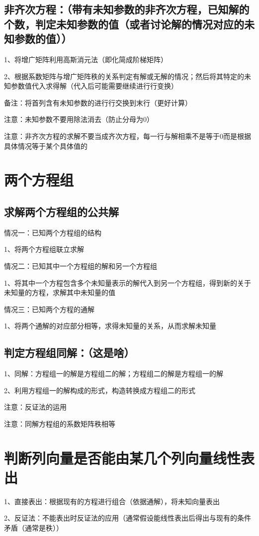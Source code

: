 \subsection{非齐次方程：（带有未知参数的非齐次方程，已知解的个数，判定未知参数的值（或者讨论解的情况对应的未知参数的值））}

1、将增广矩阵利用高斯消元法（即化简成阶梯矩阵）

2、根据系数矩阵与增广矩阵秩的关系判定有解或无解的情况；然后将其特定的未知参数值代入求得解（代入后可能需要继续进行行变换）

备注：将首列含有未知参数的进行行交换到末行（更好计算）

注意：未知参数不要用除法消去（防止分母为0）

注意：非齐次方程的求解不要当成齐次方程，每一行与解相乘不是等于0而是根据具体情况等于某个具体值的

\section{两个方程组}



\subsection{求解两个方程组的公共解}

情况一：已知两个方程组的结构

1、将两个方程组联立求解

情况二：已知其中一个方程组的解和另一个方程组

1、将其中一个方程包含多个未知量表示的解代入到另一个方程组，得到新的关于未知量的方程，求解其中未知量的值

情况三：已知两个方程的通解

1、将两个通解的对应部分相等，求得未知量的关系，从而求解未知量



\subsection{判定方程组同解：（这是啥）}

1、同解：方程组一的解是方程组二的解；方程组二的解是方程组一的解

2、利用方程组一的解构成的形式，构造转换成方程组二的形式

注意：反证法的运用

注意：同解方程组的系数矩阵秩相等



\section{判断列向量是否能由某几个列向量线性表出}

1、直接表出：根据现有的方程进行组合（依据通解），将未知向量表出

2、反证法：不能表出时反证法的应用（通常假设能线性表出后得出与现有的条件矛盾（通常是秩））

